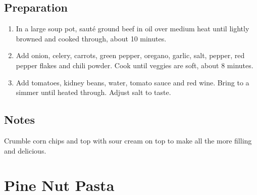 \documentclass[letterpaper,10pt,english]{sphinxmanual}
\begin{document}
\section{Preparation}
\label{\detokenize{PCC_Chili:preparation}}\begin{enumerate}
\item {} 
In a large soup pot, sauté ground beef in oil over medium heat until lightly browned and cooked through, about 10 minutes.

\item {} 
Add onion, celery, carrots, green pepper, oregano, garlic, salt, pepper, red pepper flakes and chili powder. Cook until veggies are soft, about 8 minutes.

\item {} 
Add tomatoes, kidney beans, water, tomato sauce and red wine. Bring to a simmer until heated through. Adjust salt to taste.

\end{enumerate}


\section{Notes}
\label{\detokenize{PCC_Chili:notes}}
Crumble corn chips and top with sour cream on top to make all the more filling and delicious.


\chapter{Pine Nut Pasta}
\label{\detokenize{Pine_Nut_Pasta:pine-nut-pasta}}\label{\detokenize{Pine_Nut_Pasta::doc}}
\end{document}
